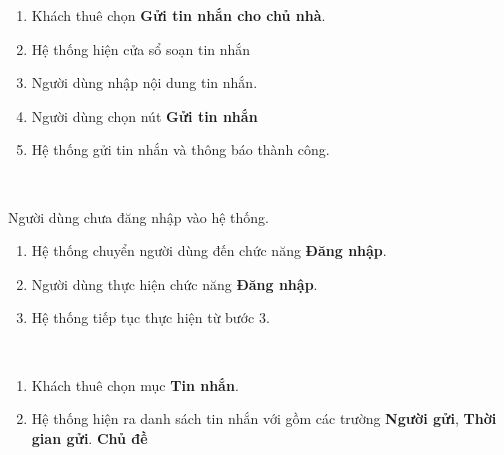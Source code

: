 \begin{usecase}
	\normalflow
	\begin{enumerate}
		\item Khách thuê chọn \textbf{Gửi tin nhắn cho chủ nhà}.
        \item Hệ thống hiện cửa sổ soạn tin nhắn
        \item Người dùng nhập nội dung tin nhắn.
        \item Người dùng chọn nút \textbf{Gửi tin nhắn}
        \item Hệ thống gửi tin nhắn và thông báo thành công.
	\end{enumerate} \\ \hline
	
	\altflow
	\begin{itemize}
		 Người dùng chưa đăng nhập vào hệ thống.
		\begin{enumerate}
		    \item Hệ thống chuyển người dùng đến chức năng \textbf{Đăng nhập}.
		    \item Người dùng thực hiện chức năng \textbf{Đăng nhập}.
		    \item Hệ thống tiếp tục thực hiện từ bước 3.
		\end{enumerate}
	\end{itemize} \\ \hline
	
	
	\noexception
\end{usecase}


\begin{usecase}
	\normalflow
	\begin{enumerate}
		\item Khách thuê chọn mục \textbf{Tin nhắn}.
        \item Hệ thống hiện ra danh sách tin nhắn với gồm các trường \textbf{Người gửi}, \textbf{Thời gian gửi}. \textbf{Chủ đề}
	\end{enumerate} \\ \hline
	
	\noalternative
	\noexception
\end{usecase}

